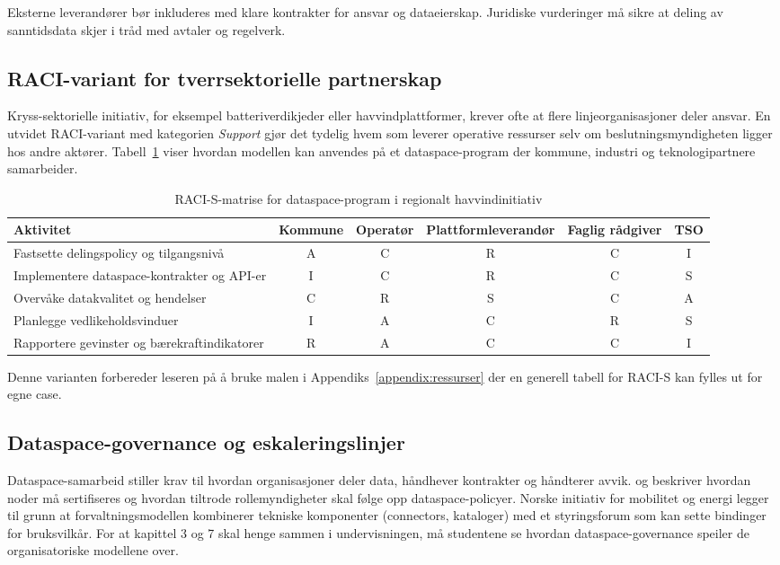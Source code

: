 Eksterne leverandører bør inkluderes med klare kontrakter for ansvar og dataeierskap. Juridiske vurderinger må sikre at deling av sanntidsdata skjer i tråd med avtaler og regelverk.

\subsection*{RACI-variant for tverrsektorielle partnerskap}
Kryss-sektorielle initiativ, for eksempel batteriverdikjeder eller havvindplattformer, krever ofte at flere linjeorganisasjoner deler ansvar. En utvidet RACI-variant med kategorien \emph{Support} gjør det tydelig hvem som leverer operative ressurser selv om beslutningsmyndigheten ligger hos andre aktører. Tabell~\ref{tab:raci-variant} viser hvordan modellen kan anvendes på et dataspace-program der kommune, industri og teknologipartnere samarbeider.

\begin{table}[h]
    \centering
    \caption{RACI-S-matrise for dataspace-program i regionalt havvindinitiativ}
    \label{tab:raci-variant}
    \begin{tabular}{p{4.3cm}ccccc}
        \toprule
        Aktivitet & Kommune & Operatør & Plattformleverandør & Faglig rådgiver & TSO \\
        \midrule
        Fastsette delingspolicy og tilgangsnivå & A & C & R & C & I \\
        Implementere dataspace-kontrakter og API-er & I & C & R & C & S \\
        Overvåke datakvalitet og hendelser & C & R & S & C & A \\
        Planlegge vedlikeholdsvinduer & I & A & C & R & S \\
        Rapportere gevinster og bærekraftindikatorer & R & A & C & C & I \\
        \bottomrule
    \end{tabular}
\end{table}

Denne varianten forbereder leseren på å bruke malen i Appendiks~\ref{appendix:ressurser} der en generell tabell for RACI-S kan fylles ut for egne case.

\subsection*{Dataspace-governance og eskaleringslinjer}
Dataspace-samarbeid stiller krav til hvordan organisasjoner deler data, håndhever kontrakter og håndterer avvik. \citet{idsa2023ram} og \citet{gaiax2023architecture} beskriver hvordan noder må sertifiseres og hvordan tiltrode rollemyndigheter skal følge opp dataspace-policyer. Norske initiativ for mobilitet og energi legger til grunn at forvaltningsmodellen kombinerer tekniske komponenter (connectors, kataloger) med et styringsforum som kan sette bindinger for bruksvilkår.\citep{ec2023mobilitydataspace} For at kapittel 3 og 7 skal henge sammen i undervisningen, må studentene se hvordan dataspace-governance speiler de organisatoriske modellene over.

